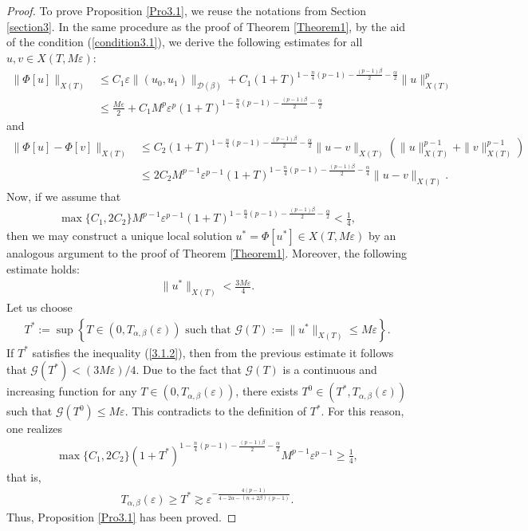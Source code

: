 \documentclass[11pt,reqno]{amsart}
\begin{document}
\begin{proof}
   To prove Proposition \ref{Pro3.1}, we reuse the notations from Section \ref{section3}. In the same procedure as the proof of Theorem \ref{Theorem1}, by the aid of the condition (\ref{condition3.1}), we derive the following estimates for all $u, v \in X(T, M\varepsilon)$:
    \begin{align*}
        \|\Phi[u]\|_{X(T)} &\leq C_1\varepsilon \|(u_0, u_1)\|_{\mathcal{D}(\beta)}+C_1(1+T)^{1-\frac{n}{4}(p-1)-\frac{(p-1)\beta}{2}-\frac{\alpha}{2}} \|u\|_{X(T)}^p\\
        & \leq \frac{M\varepsilon}{2} + C_1 M^p \varepsilon^p (1+T)^{1-\frac{n}{4}(p-1)-\frac{(p-1)\beta}{2}-\frac{\alpha}{2}}
    \end{align*}
    and 
    \begin{align*}
        \|\Phi[u]-\Phi[v]\|_{X(T)} &\leq C_2 (1+T)^{1-\frac{n}{4}(p-1)-\frac{(p-1)\beta}{2}-\frac{\alpha}{2}} \|u-v\|_{X(T)} \left(\|u\|_{X(T)}^{p-1} + \|v\|_{X(T)}^{p-1}\right)\\
        &\leq 2C_2 M^{p-1} \varepsilon^{p-1} (1+T)^{1-\frac{n}{4}(p-1)-\frac{(p-1)\beta}{2}-\frac{\alpha}{4}} \|u-v\|_{X(T)}.
    \end{align*}
    Now, if we assume that
\begin{align}\label{3.1.2}
    \max\{C_1, 2C_2\} M^{p-1} \varepsilon^{p-1} (1+T)^{1-\frac{n}{4}(p-1)-\frac{(p-1)\beta}{2}-\frac{\alpha}{2}} < \frac{1}{4},
\end{align}
then we may construct a unique local solution $u^* = \Phi[u^*] \in X(T , M\varepsilon)$ by an analogous argument to the proof of Theorem \ref{Theorem1}. Moreover, the following estimate holds:
    \begin{align*}
        \|u^*\|_{X(T)} < \frac{3M\varepsilon}{4}.
    \end{align*}
    Let us choose
    \begin{align*}
        T^* := \sup\left\{T \in (0, T_{\alpha, \beta}(\varepsilon)) \text{ such that } \mathcal{G}(T) := \|u^*\|_{X(T)} \leq M\varepsilon\right\}.
    \end{align*}
    If $T^*$ satisfies the inequality (\ref{3.1.2}), then from the previous estimate it follows that $\mathcal{G}(T^*) < (3M\varepsilon)/4$. Due to the fact that $\mathcal{G}(T)$ is a continuous and increasing function for any $T \in (0, T_{\alpha, \beta}(\varepsilon))$, there exists $T^0 \in (T^*, T_{\alpha, \beta}(\varepsilon))$ such that $\mathcal{G}(T^0) \leq M\varepsilon$. This contradicts to the definition of $T^*$. For this reason, one realizes
    \begin{align*}
        \max\{C_1, 2 C_2\} (1+T^*)^{1-\frac{n}{4}(p-1) -\frac{(p-1)\beta}{2}-\frac{\alpha}{2}} M^{p-1} \varepsilon^{p-1} \geq \frac{1}{4},
    \end{align*}
    that is,
    \begin{align*}
        T_{\alpha, \beta}(\varepsilon) \geq T^* \gtrsim \varepsilon^{-\frac{4(p-1)}{4-2\alpha -(n+2\beta)(p-1)}}.
    \end{align*}
     Thus, Proposition \ref{Pro3.1} has been proved.
\end{proof}
\end{document}
